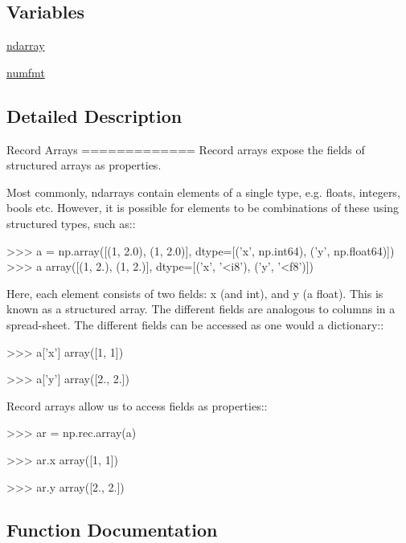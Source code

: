\subsection*{Variables}
\begin{DoxyCompactItemize}
\item 
\hyperlink{namespacenumpy_1_1core_1_1records_acd68ef867d33414864235d9d0873641e}{ndarray}
\item 
\hyperlink{namespacenumpy_1_1core_1_1records_ad0077c51c621f0943017c3fdeef1cd83}{numfmt}
\end{DoxyCompactItemize}


\subsection{Detailed Description}
\begin{DoxyVerb}Record Arrays
=============
Record arrays expose the fields of structured arrays as properties.

Most commonly, ndarrays contain elements of a single type, e.g. floats,
integers, bools etc.  However, it is possible for elements to be combinations
of these using structured types, such as::

  >>> a = np.array([(1, 2.0), (1, 2.0)], dtype=[('x', np.int64), ('y', np.float64)])
  >>> a
  array([(1, 2.), (1, 2.)], dtype=[('x', '<i8'), ('y', '<f8')])

Here, each element consists of two fields: x (and int), and y (a float).
This is known as a structured array.  The different fields are analogous
to columns in a spread-sheet.  The different fields can be accessed as
one would a dictionary::

  >>> a['x']
  array([1, 1])

  >>> a['y']
  array([2., 2.])

Record arrays allow us to access fields as properties::

  >>> ar = np.rec.array(a)

  >>> ar.x
  array([1, 1])

  >>> ar.y
  array([2., 2.])\end{DoxyVerb}
 

\subsection{Function Documentation}
\mbox{\label{namespacenumpy_1_1core_1_1records_a19d473bb11a2a4e0f1a677a0981313d2}} 
